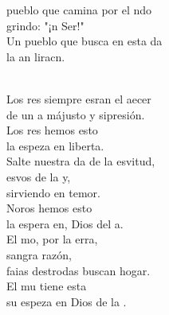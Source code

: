 \begin{cancion}%
	\begin{chorus}%
	pueblo que camina por el ndo\\
	grindo: "¡n Ser!" \\
	Un pueblo que busca en esta da\\
	la an liracn.\\
	\end{chorus}%
	\jump\\
	Los res siempre esran el aecer\\
	de un a májusto y sipresión.\\
	Los res hemos esto \\
	la espeza en  liberta.\\
\jump
	Salte nuestra da de la esvitud,\\
	esvos de la y, \\
	sirviendo en temor.\\
	Noros hemos esto \\
	la espera en, Dios del a.\\
\jump
	El mo, por la erra, \\
	sangra  razón,\\
	faias destrodas buscan hogar.\\
	El mu tiene esta \\
	su espeza en  Dios de la .\\
\end{cancion}%
